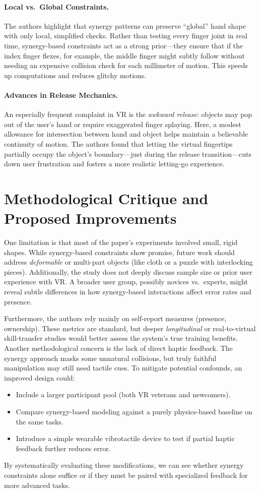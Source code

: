 \documentclass[11pt]{llncs}
\begin{document}
\paragraph{Local vs.\ Global Constraints.}
The authors highlight that synergy patterns can preserve ``global'' hand shape with only local, simplified checks. Rather than testing every finger joint in real time, synergy-based constraints act as a strong prior---they ensure that if the index finger flexes, for example, the middle finger might subtly follow without needing an expensive collision check for each millimeter of motion. This speeds up computations and reduces glitchy motions.

\paragraph{Advances in Release Mechanics.}
An especially frequent complaint in VR is the \emph{awkward release}: objects may pop out of the user’s hand or require exaggerated finger splaying. Here, a modest allowance for intersection between hand and object helps maintain a believable continuity of motion. The authors found that letting the virtual fingertips partially occupy the object’s boundary—just during the release transition—cuts down user frustration and fosters a more realistic letting-go experience.

\section*{Methodological Critique and Proposed Improvements}
One limitation is that most of the paper’s experiments involved small, rigid shapes. While synergy-based constraints show promise, future work should address \emph{deformable} or multi-part objects (like cloth or a puzzle with interlocking pieces). Additionally, the study does not deeply discuss sample size or prior user experience with VR. A broader user group, possibly novices vs.\ experts, might reveal subtle differences in how synergy-based interactions affect error rates and presence.

Furthermore, the authors rely mainly on self-report measures (presence, ownership). These metrics are standard, but deeper \emph{longitudinal} or real-to-virtual skill-transfer studies would better assess the system's true training benefits. Another methodological concern is the lack of direct haptic feedback. The synergy approach masks some unnatural collisions, but truly faithful manipulation may still need tactile cues. To mitigate potential confounds, an improved design could:
\begin{itemize}
    \item Include a larger participant pool (both VR veterans and newcomers).
    \item Compare synergy-based modeling against a purely physics-based baseline on the same tasks.
    \item Introduce a simple wearable vibrotactile device to test if partial haptic feedback further reduces error.
\end{itemize}
By systematically evaluating these modifications, we can see whether synergy constraints alone suffice or if they must be paired with specialized feedback for more advanced tasks.
\end{document}
